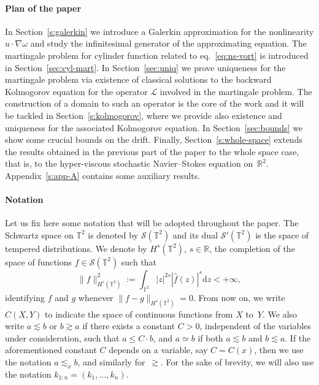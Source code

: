 \documentclass[10pt]{article}
\newcommand{\assign}{:=}
\newcommand{\mathd}{\mathrm{d}}
\begin{document}
\paragraph*{Plan of the paper}In Section~\ref{s:galerkin} we introduce a
Galerkin approximation for the nonlinearity $u \cdot \nabla \omega$ and study
the infinitesimal generator of the approximating equation. The martingale
problem for cylinder function related to eq.~{\eqref{eq:ns-vort}} is
introduced in Section~\ref{sec:cyl-mart}. In Section~\ref{sec:uniq} we prove
uniqueness for the martingale problem via existence of classical solutions to
the backward Kolmogorov equation for the operator $\mathcal{L}$ involved in
the martingale problem. The construction of a domain to such an operator is
the core of the work and it will be tackled in Section~\ref{s:kolmogorov},
where we provide also existence and uniqueness for the associated Kolmogorov
equation. In Section~\ref{sec:bounds} we show some crucial bounds on the
drift. Finally, Section~\ref{s:whole-space} extends the results obtained in
the previous part of the paper to the whole space case, that is, to the
hyper-viscous stochastic Navier--Stokes equation on~$\mathbb{R}^2$.
Appendix~\ref{s:app-A} contains some auxiliary results.

\paragraph{Notation}Let us fix here some notation that will be adopted
throughout the paper. The Schwartz space on $\mathbb{T}^2$ is denoted by
$\mathcal{S} (\mathbb{T}^2)$ and its dual $\mathcal{S}' (\mathbb{T}^2)$ is the
space of tempered distributions. We denote by $H^s (\mathbb{T}^2)$, $s \in
\mathbb{R}$, the completion of the space of functions $f \in \mathcal{S}
(\mathbb{T}^2)$ such that
\[ \| f \|_{H^s (\mathbb{T}^2)}^2 \assign \int_{\mathbb{T}^2} | z |^{2 s} |
   \hat{f} (z) |^s \mathd z < + \infty, \]
identifying $f$ and $g$ whenever $\| f - g \|_{H^s (\mathbb{T}^2)} = 0$. From
now on, we write $C (X, Y)$ to indicate the space of continuous functions from
$X$ to~$Y$. We also write $a \lesssim b$ or $b \gtrsim a$ if there exists a
constant $C > 0$, independent of the variables under consideration, such that
$a \leqslant C \cdot b$, and $a \simeq b$ if both $a \lesssim b$ and $b
\lesssim a$. If the aforementioned constant $C$ depends on a variable, say $C
= C (x)$, then we use the notation $a \lesssim_x b$, and similarly
for~$\gtrsim$. For the sake of brevity, we will also use the notation $k_{1 :
n} = (k_1, \ldots, k_n)$.
\end{document}
